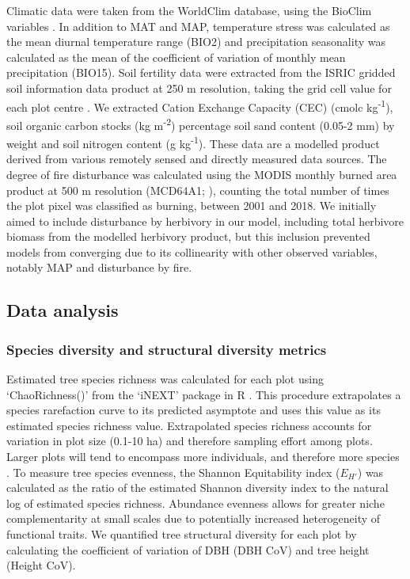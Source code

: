 \documentclass[11pt,a4paper]{article}
\begin{document}
Climatic data were taken from the WorldClim database, using the BioClim variables \citep{Fick2017}. In addition to MAT and MAP, temperature stress was calculated as the mean diurnal temperature range (BIO2) and precipitation seasonality was calculated as the mean of the coefficient of variation of monthly mean precipitation (BIO15). Soil fertility data were extracted from the ISRIC gridded soil information data product at 250 m resolution, taking the grid cell value for each plot centre \citep{Hengl2017}. We extracted Cation Exchange Capacity (CEC) (cmolc kg\textsuperscript{-1}), soil organic carbon stocks (kg m\textsuperscript{-2}) percentage soil sand content (0.05-2 mm) by weight and soil nitrogen content (g kg\textsuperscript{-1}). These data are a modelled product derived from various remotely sensed and directly measured data sources. The degree of fire disturbance was calculated using the MODIS monthly burned area product at 500 m resolution (MCD64A1; \citealt{MODIS_burn}), counting the total number of times the plot pixel was classified as burning, between 2001 and 2018. We initially aimed to include disturbance by herbivory in our model, including total herbivore biomass from the \citet{Hempson2017} modelled herbivory product, but this inclusion prevented models from converging due to its collinearity with other observed variables, notably MAP and disturbance by fire. 

\subsection{Data analysis}

\subsubsection{Species diversity and structural diversity metrics}

Estimated tree species richness was calculated for each plot using `ChaoRichness()' from the `iNEXT' package in R \citep{Hsieh2016}. This procedure extrapolates a species rarefaction curve to its predicted asymptote and uses this value as its estimated species richness value. Extrapolated species richness accounts for variation in plot size (0.1-10 ha) and therefore sampling effort among plots. Larger plots will tend to encompass more individuals, and therefore more species \citep{Dengler2009}. To measure tree species evenness, the Shannon Equitability index ($E_{H'}$) \citep{Smith1996} was calculated as the ratio of the estimated Shannon diversity index to the natural log of estimated species richness. Abundance evenness allows for greater niche complementarity at small scales due to potentially increased heterogeneity of functional traits. We quantified tree structural diversity for each plot by calculating the coefficient of variation of DBH (DBH CoV) and tree height (Height CoV). 
\end{document}
